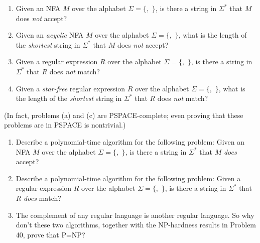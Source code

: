 \begin{exercises}
\begin{enumerate}
\item Given an NFA $M$ over the alphabet $\Sigma = \{$$,$ $\}$, is there a string in $\Sigma^*$ that $M$ does \textit{not} accept?

\item Given an \textit{acyclic} NFA $M$ over the alphabet $\Sigma = \{$$,$ $\}$, what is the length of the \textit{shortest} string in $\Sigma^*$ that $M$ does \textit{not} accept?

\item Given a regular expression $R$ over the alphabet $\Sigma = \{$$,$ $\}$, is there a string in $\Sigma^*$ that $R$ does \textit{not} match?

\item Given a \textit{star-free} regular expression $R$ over the alphabet $\Sigma = \{$$,$ $\}$, what is the length of the \textit{shortest} string in $\Sigma^*$ that $R$ does \textit{not} match?

\end{enumerate}

(In fact, problems (a) and (c) are PSPACE-complete; even proving that these problems are in PSPACE is nontrivial.)

\item {}
\begin{enumerate}
\item Describe a polynomial-time algorithm for the following problem: Given an NFA $M$ over the alphabet $\Sigma = \{$$,$ $\}$, is there a string in $\Sigma^*$ that $M$ \textit{does} accept?

\item Describe a polynomial-time algorithm for the following problem: Given a regular expression $R$ over the alphabet $\Sigma = \{$$,$ $\}$, is there a string in $\Sigma^*$ that $R$ \textit{does} match?

\item The complement of any regular language is another regular language. So why don’t these two algorithms, together with the NP-hardness results in Problem 40, prove that P=NP?

\end{enumerate}


\end{exercises}
